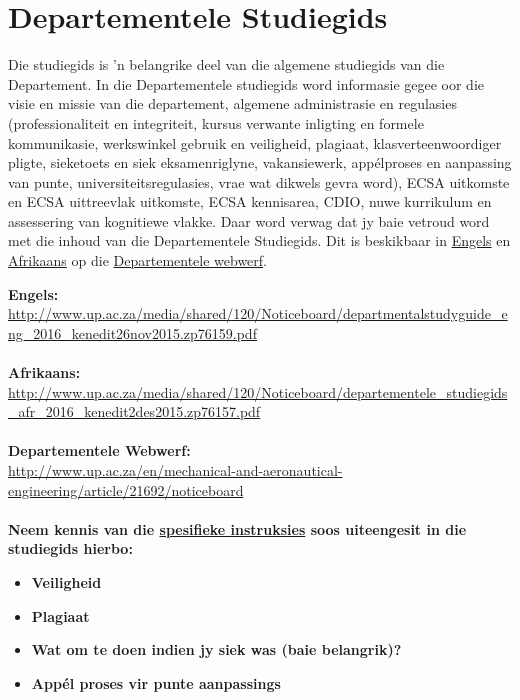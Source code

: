 \section{Departementele Studiegids}\label{sec:department}
    Die studiegids is 'n belangrike deel van die algemene studiegids van die
    Departement. In die Departementele studiegids word informasie gegee oor die
    visie en missie van die departement, algemene administrasie en regulasies
    (professionaliteit en integriteit, kursus verwante inligting en formele
    kommunikasie, werkswinkel gebruik en veiligheid, plagiaat,
    klasverteenwoordiger pligte, sieketoets en siek eksamenriglyne,
    vakansiewerk, app\'{e}lproses en aanpassing van punte,
    universiteitsregulasies, vrae wat dikwels gevra word), ECSA uitkomste en
    ECSA uittreevlak uitkomste, ECSA kennisarea, CDIO, nuwe kurrikulum en
    assessering van kognitiewe vlakke.  Daar word verwag dat jy baie vetroud
    word met die inhoud van die Departementele Studiegids.  Dit is beskikbaar
    in
    \href{http://www.up.ac.za/media/shared/120/Noticeboard/departmentalstudyguide_eng_2016_kenedit26nov2015.zp76159.pdf}{Engels}
    en
    \href{http://www.up.ac.za/media/shared/120/Noticeboard/departementele_studiegids_afr_2016_kenedit2des2015.zp76157.pdf}{Afrikaans}
    op die
    \href{http://www.up.ac.za/en/mechanical-and-aeronautical-engineering/article/21692/noticeboard}{Departementele webwerf}.

    \noindent
    \textbf{Engels:} \\
    \url{http://www.up.ac.za/media/shared/120/Noticeboard/departmentalstudyguide_eng_2016_kenedit26nov2015.zp76159.pdf} \\~\\
    \textbf{Afrikaans:} \\
    \url{http://www.up.ac.za/media/shared/120/Noticeboard/departementele_studiegids_afr_2016_kenedit2des2015.zp76157.pdf} \\~\\
    \textbf{Departementele Webwerf:} \\
    \url{http://www.up.ac.za/en/mechanical-and-aeronautical-engineering/article/21692/noticeboard} \\~\\

    \noindent
    \textbf{Neem kennis van die \uline{spesifieke instruksies} soos uiteengesit
    in die studiegids hierbo:}
    \begin{itemize}
        \item \textbf{Veiligheid}
        \item \textbf{Plagiaat}
        \item \textbf{Wat om te doen indien jy siek was (baie belangrik)?}
        \item \textbf{App\'el proses vir punte aanpassings}
    \end{itemize}

